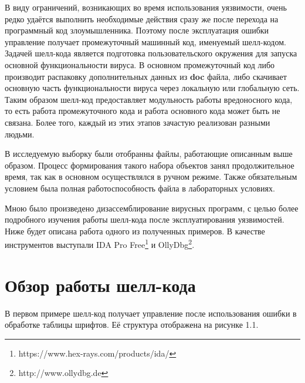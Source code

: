 В виду ограничений, возникающих во время использования уязвимости, очень редко удаётся выполнить необходимые действия сразу же после перехода на программный код злоумышленника.
Поэтому после эксплуатация ошибки управление получает промежуточный машинный код, именуемый шелл-кодом.
Задачей шелл-кода является подготовка пользовательского окружения для запуска основной функциональности вируса.
В основном промежуточный код либо производит распаковку дополнительных данных из \textbf{doc} файла, либо скачивает основную часть функциональности вируса через локальную или глобальную сеть.
Таким образом шелл-код предоставляет модульность работы вредоносного кода, то есть работа промежуточного кода и работа основного кода может быть не связана.
Более того, каждый из этих этапов зачастую реализован разными людьми.

В исследуемую выборку были отобранны файлы, работающие описанным выше образом.
Процесс формирования такого набора объектов занял продолжительное время, так как в основном осуществлялся в ручном режиме.
Также обязательным условием была полная работоспособность файла в лабораторных условиях.

Мною было произведено дизассемблирование вирусных программ, с целью более подробного изучения работы шелл-кода после эксплуатирования уязвимостей.
Ниже будет описана работа одного из полученных примеров.
В качестве инструментов выступали IDA Pro Free\footnote{https://www.hex-rays.com/products/ida/} и OllyDbg\footnote{http://www.ollydbg.de}.

\newpage
\section{Обзор работы шелл-кода}

В первом примере шелл-код получает управление после использования ошибки в обработке таблицы шрифтов.
Её структура отображена на рисунке 1.1. 

